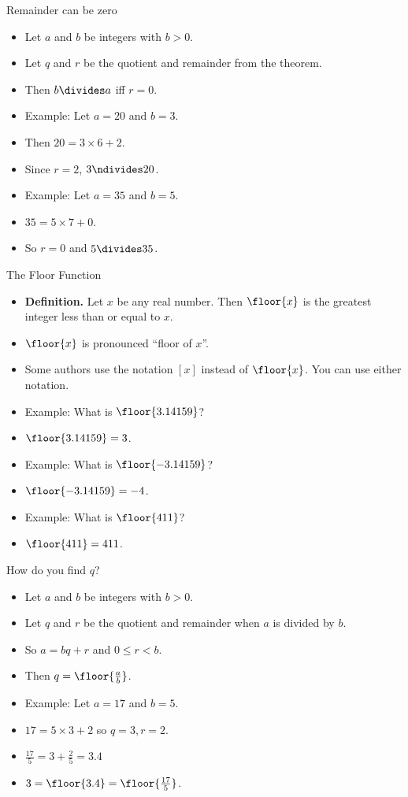 \documentclass{beamer}
\begin{document}
\begin{frame}{Remainder can be zero}


\begin{itemize}
  \item Let $a$ and $b$ be integers with $b>0$.
  \item Let $q$ and $r$ be the quotient and remainder from the theorem.
  \item Then $b\divides a$ iff $r=0$.
  \item Example: Let $a=20$ and $b=3$.
  \item Then $20 = 3 \times 6 + 2$.
  \item Since $r=2$, $3\ndivides 20$.
  \item Example: Let $a=35$ and $b=5$.
  \item $35 = 5 \times 7 + 0$.
  \item So $r=0$ and $5\divides 35$.
\end{itemize}

\end{frame}

\begin{frame}{The Floor Function}

\begin{itemize}
  \item \textbf{Definition.} Let $x$ be any real number. Then $\floor{x}$ is the greatest integer less than or equal to $x$.
  \item $\floor{x}$ is pronounced ``floor of $x$''.
  \item Some authors use the notation $[x]$ instead of $\floor{x}$. You can use either notation.
  \item Example: What is $\floor{3.14159}$?
  \item $\floor{3.14159} = 3$.
  \item Example: What is $\floor{-3.14159}$?
  \item $\floor{-3.14159} = -4$.
  \item Example: What is $\floor{411}$?
  \item $\floor{411} = 411$.
\end{itemize}

\end{frame}

\begin{frame}{How do you find $q$?}

\begin{itemize}
  \item Let $a$ and $b$ be integers with $b>0$.
  \item Let $q$ and $r$ be the quotient
  and remainder when $a$ is divided by $b$.
  \item So $a = bq + r$ and $0\leq r < b$.
  \item Then $q = \floor{\frac{a}{b}}$.
  \item Example: Let $a = 17$ and $b=5$.
  \item $17 = 5 \times 3 + 2$ so $q=3, r=2$.
  \item $\frac{17}{5} = 3  + \frac{2}{5} = 3.4$
  \item $3 = \floor{3.4} = \floor{\frac{17}{5}}$.
\end{itemize}

\end{frame}
\end{document}
